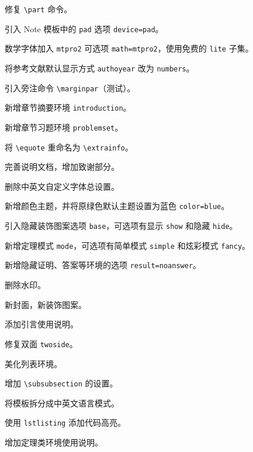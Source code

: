 \documentclass[lang=cn,newtx,10pt,scheme=chinese]{elegantbook}
\begin{document}

\begin{change}
  \item 修复 \lstinline{\part} 命令。
  \item 引入 Note 模板中的 \lstinline{pad} 选项 \lstinline{device=pad}。
  \item 数学字体加入 \lstinline{mtpro2} 可选项 \lstinline{math=mtpro2}，使用免费的 \lstinline{lite} 子集。
  \item 将参考文献默认显示方式 \lstinline{authoyear} 改为 \lstinline{numbers}。
  \item 引入旁注命令 \lstinline{\marginpar}（测试）。
  \item 新增章节摘要环境 \lstinline{introduction}。
  \item 新增章节习题环境 \lstinline{problemset}。
  \item 将 \lstinline{\equote} 重命名为 \lstinline{\extrainfo}。
  \item 完善说明文档，增加致谢部分。
\end{change}


\begin{change}
  \item 删除中英文自定义字体总设置。
  \item 新增颜色主题，并将原绿色默认主题设置为蓝色 \lstinline{color=blue}。
  \item 引入隐藏装饰图案选项 \lstinline{base}，可选项有显示 \lstinline{show} 和隐藏 \lstinline{hide}。
  \item 新增定理模式 \lstinline{mode}，可选项有简单模式 \lstinline{simple} 和炫彩模式 \lstinline{fancy}。
  \item 新增隐藏证明、答案等环境的选项 \lstinline{result=noanswer}。
\end{change}


\begin{change}
  \item 删除水印。
  \item 新封面，新装饰图案。
  \item 添加引言使用说明。
  \item 修复双面 \lstinline{twoside}。
  \item 美化列表环境。
  \item 增加 \lstinline{\subsubsection} 的设置。
  \item 将模板拆分成中英文语言模式。
  \item 使用 \lstinline{lstlisting} 添加代码高亮。
  \item 增加定理类环境使用说明。
\end{change}
\end{document}

